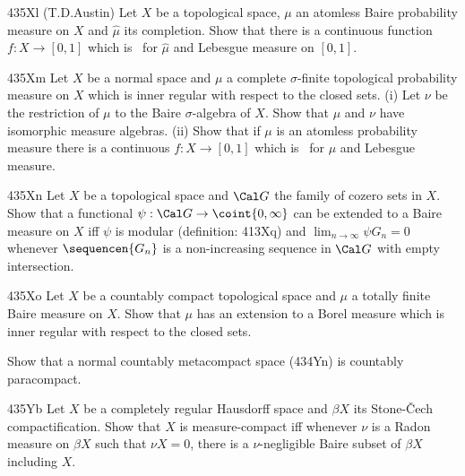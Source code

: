 {\spheader 435Xl (T.D.Austin) Let $X$ be a topological space, $\mu$ an
atomless Baire probability measure on $X$ and $\hat\mu$ its completion.
Show that there is a continuous function $f:X\to[0,1]$ which is \imp\ for
$\hat\mu$ and Lebesgue measure on $[0,1]$.

\spheader 435Xm Let $X$ be a normal space and $\mu$ a
complete $\sigma$-finite
topological probability measure on $X$ which is inner regular
with respect to the closed sets.
(i) Let $\nu$ be the restriction of $\mu$ to the Baire $\sigma$-algebra
of $X$.    Show that $\mu$ and $\nu$ have isomorphic measure algebras.
(ii) Show that if $\mu$ is an atomless probability measure there is a
continuous $f:X\to[0,1]$ which is \imp\ for $\mu$ and Lebesgue measure.

\spheader 435Xn Let $X$ be a topological space and $\Cal G$ the family of
cozero sets in $X$.
Show that a functional $\psi:\Cal G\to\coint{0,\infty}$ can
be extended to a Baire measure on $X$ iff $\psi$ is modular (definition:
413Xq) and
$\lim_{n\to\infty}\psi G_n=0$ whenever $\sequencen{G_n}$ is a
non-increasing sequence in $\Cal G$ with empty intersection.   

\spheader 435Xo Let $X$ be a countably compact topological space and $\mu$
a totally finite Baire measure on $X$.   Show that $\mu$ has an extension
to a Borel measure which is inner regular with respect to the closed sets.

Show that a normal countably metacompact space (434Yn)
is countably paracompact.

\spheader 435Yb
Let $X$ be a completely regular Hausdorff space and $\beta X$ its
Stone-\v Cech
compactification.   Show that $X$ is measure-compact iff whenever $\nu$
is a Radon measure on $\beta X$ such that $\nu X=0$, there is a
$\nu$-negligible Baire subset of $\beta X$ including $X$.


}%

